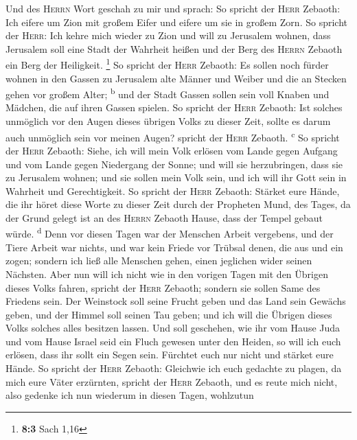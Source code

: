  Und des \textsc{Herrn} Wort geschah zu mir und sprach:
 So spricht der \textsc{Herr} Zebaoth: Ich eifere um Zion
mit großem Eifer und eifere um sie in großem Zorn.  So
spricht der \textsc{Herr}: Ich kehre mich wieder zu Zion und will zu
Jerusalem wohnen, dass Jerusalem soll eine Stadt der Wahrheit heißen und
der Berg des \textsc{Herrn} Zebaoth ein Berg der Heiligkeit. \footnote{\textbf{8:3}
  Sach 1,16}  So spricht der \textsc{Herr} Zebaoth: Es
sollen noch fürder wohnen in den Gassen zu Jerusalem alte Männer und
Weiber und die an Stecken gehen vor großem Alter; \textsuperscript{b}
 und der Stadt Gassen sollen sein voll Knaben und Mädchen,
die auf ihren Gassen spielen.  So spricht der
\textsc{Herr} Zebaoth: Ist solches unmöglich vor den Augen dieses
übrigen Volks zu dieser Zeit, sollte es darum auch unmöglich sein vor
meinen Augen? spricht der \textsc{Herr} Zebaoth. \textsuperscript{c}
 So spricht der \textsc{Herr} Zebaoth: Siehe, ich will
mein Volk erlösen vom Lande gegen Aufgang und vom Lande gegen Niedergang
der Sonne;  und will sie herzubringen, dass sie zu
Jerusalem wohnen; und sie sollen mein Volk sein, und ich will ihr Gott
sein in Wahrheit und Gerechtigkeit.  So spricht der
\textsc{Herr} Zebaoth: Stärket eure Hände, die ihr höret diese Worte zu
dieser Zeit durch der Propheten Mund, des Tages, da der Grund gelegt ist
an des \textsc{Herrn} Zebaoth Hause, dass der Tempel gebaut würde.
\textsuperscript{d}  Denn vor diesen Tagen war der
Menschen Arbeit vergebens, und der Tiere Arbeit war nichts, und war kein
Friede vor Trübsal denen, die aus und ein zogen; sondern ich ließ alle
Menschen gehen, einen jeglichen wider seinen Nächsten. 
Aber nun will ich nicht wie in den vorigen Tagen mit den Übrigen dieses
Volks fahren, spricht der \textsc{Herr} Zebaoth;  sondern
sie sollen Same des Friedens sein. Der Weinstock soll seine Frucht geben
und das Land sein Gewächs geben, und der Himmel soll seinen Tau geben;
und ich will die Übrigen dieses Volks solches alles besitzen lassen.
 Und soll geschehen, wie ihr vom Hause Juda und vom Hause
Israel seid ein Fluch gewesen unter den Heiden, so will ich euch
erlösen, dass ihr sollt ein Segen sein. Fürchtet euch nur nicht und
stärket eure Hände.  So spricht der \textsc{Herr}
Zebaoth: Gleichwie ich euch gedachte zu plagen, da mich eure Väter
erzürnten, spricht der \textsc{Herr} Zebaoth, und es reute mich nicht,
 also gedenke ich nun wiederum in diesen Tagen, wohlzutun
